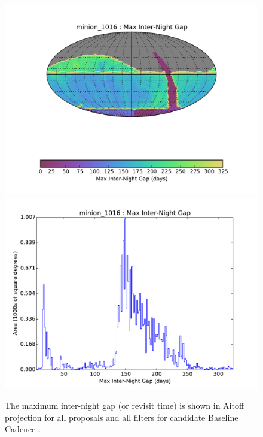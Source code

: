 \begin{figure}[t!]
\vskip -0.0in
\includegraphics[angle=0,width=0.49\hsize,clip]{figs/cadence/minion_1016_Max_Inter-Night_Gap_HEAL_SkyMap.pdf}
\includegraphics[angle=0,width=0.49\hsize,clip]{figs/cadence/minion_1016_Max_Inter-Night_Gap_HEAL_Histogram.pdf}
\vskip -0.1in
\caption{The maximum inter-night gap (or revisit time) is shown in Aitoff projection
for all proposals and all filters for candidate Baseline Cadence .}
\label{fig:enigmaMAXGapAll}
\end{figure}



